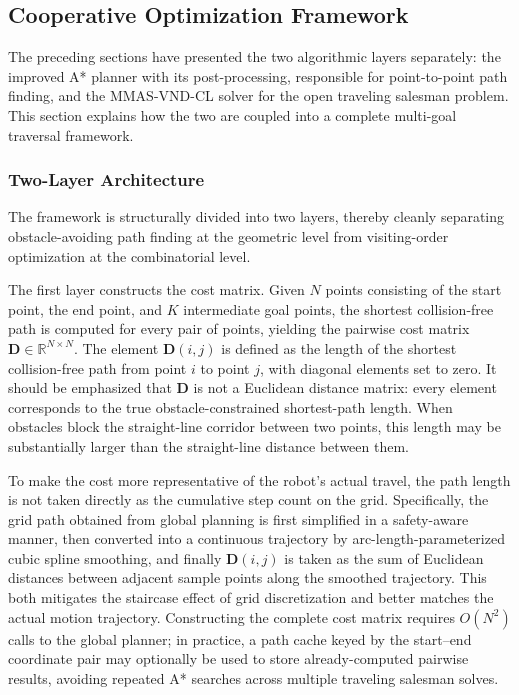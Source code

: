 \subsection{Cooperative Optimization Framework}
\label{subsec:coop}

The preceding sections have presented the two algorithmic layers separately: the improved A* planner with its post-processing, responsible for point-to-point path finding, and the MMAS-VND-CL solver for the open traveling salesman problem. This section explains how the two are coupled into a complete multi-goal traversal framework.

\subsubsection{Two-Layer Architecture}

The framework is structurally divided into two layers, thereby cleanly separating obstacle-avoiding path finding at the geometric level from visiting-order optimization at the combinatorial level.

The first layer constructs the cost matrix. Given $N$ points consisting of the start point, the end point, and $K$ intermediate goal points, the shortest collision-free path is computed for every pair of points, yielding the pairwise cost matrix $\mathbf{D} \in \mathbb{R}^{N \times N}$. The element $\mathbf{D}(i, j)$ is defined as the length of the shortest collision-free path from point $i$ to point $j$, with diagonal elements set to zero. It should be emphasized that $\mathbf{D}$ is not a Euclidean distance matrix: every element corresponds to the true obstacle-constrained shortest-path length. When obstacles block the straight-line corridor between two points, this length may be substantially larger than the straight-line distance between them.

To make the cost more representative of the robot's actual travel, the path length is not taken directly as the cumulative step count on the grid. Specifically, the grid path obtained from global planning is first simplified in a safety-aware manner, then converted into a continuous trajectory by arc-length-parameterized cubic spline smoothing, and finally $\mathbf{D}(i, j)$ is taken as the sum of Euclidean distances between adjacent sample points along the smoothed trajectory. This both mitigates the staircase effect of grid discretization and better matches the actual motion trajectory. Constructing the complete cost matrix requires $O(N^2)$ calls to the global planner; in practice, a path cache keyed by the start--end coordinate pair may optionally be used to store already-computed pairwise results, avoiding repeated A* searches across multiple traveling salesman solves.

